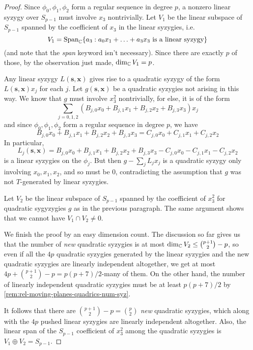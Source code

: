 \documentclass[fleqn,reqno]{amsart}
\begin{document}
\begin{proof}
Since $\phi_0,\phi_1,\phi_2$ form a regular sequence in degree $p$,
a nonzero linear syzygy over $S_{p-1}$ must involve $x_3$ nontrivially.
Let $V_1$ be the linear subspace of $S_{p-1}$ spanned by the
coefficient of $x_3$ in the linear syzygies, i.e.
\[
	V_1=\operatorname{Span}_{\mathbb{C}}\{a_3:a_0x_1+\ldots+a_3x_3 \text{ is a linear syzygy}\}
\]
(and note that the {\em span} keyword isn't necessary).
Since there are exactly $p$ of those, by the observation just made, $\dim_{\mathbb{C}} V_1=p$.

Any linear syzygy $L(\mathbf s, \mathbf x)$ gives rise to a quadratic syzygy of the form
$L(\mathbf s, \mathbf x)x_j$ for each $j$.
Let $g(\mathbf s,\mathbf x)$ be a quadratic syzygies not arising in this way.
We know that $g$ must involve $x_3^2$ nontrivially,
for else, it is of the form
\[
	\sum_{j=0,1,2} (B_{j,0}x_0+B_{j,1}x_1+B_{j,2}x_2+B_{j,3}x_3) x_j
\]
and since $\phi_0,\phi_1,\phi_2$ form a regular sequence in degree $p$,
we have
\[
	B_{j,0}x_0+B_{j,1}x_1+B_{j,2}x_2+B_{j,3}x_3=C_{j,0}x_0+C_{j,1}x_1+C_{j,2}x_2
\]
In particular,
\[
	L_j(\mathbf s,\mathbf x)=B_{j,0}x_0+B_{j,1}x_1+B_{j,2}x_2+B_{j,3}x_3-C_{j,0}x_0-C_{j,1}x_1-C_{j,2}x_2
\]
is a linear syzygies on the $\phi_j$.
But then $g-\sum_j L_jx_j$ is a quadratic syzygy only involving $x_0,x_1,x_2$,
and so must be $0$, contradicting the assumption that $g$ was not $T$-generated by linear syzygies.

Let $V_2$ be the linear subspace of $S_{p-1}$ spanned by the coefficient of $x_3^2$ for quadratic
sygyzygies $g$ as in the previous paragraph. The same argument shows that we cannot have $V_1\cap V_2\neq0$.

We finish the proof by an easy dimension count.
The discussion so far gives us that the number of {\em new} quadratic syzygies is at most
$\dim_{\mathbb{C}} V_2\leq\binom{p+1}{2}-p$,
so even if all the $4p$ quadratic syzygies generated by the linear syzygies
and the new quadratic syzygies are linearly independent altogether,
we get at most $4p+\binom{p+1}{2}-p=p(p+7)/2$-many of them.
On the other hand,
the number of linearly independent quadratic syzygies must be at least $p(p+7)/2$
by \eqref{rem:rel-moving-planes-quadrics-num-syz}.

It follows that there are $\binom{p+1}{2}-p=\binom{p}{2}$ {\em new} quadratic syzygies,
which along with the $4p$ pushed linear syzygies are linearly independent altogether.
Also, the linear span of the $S_{p-1}$ coefficient of $x_3^2$ among the quadratic syzygies
is $V_1\oplus V_2=S_{p-1}$.
\end{proof}
\end{document}
